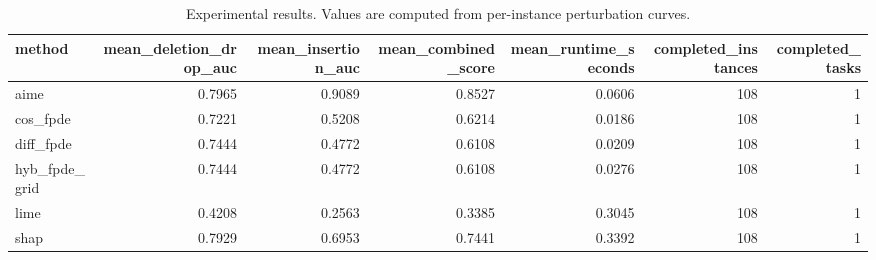 \begin{table}[t]
\caption{Experimental results. Values are computed from per-instance perturbation curves.}
\label{tab:main_results_computed}
\centering
\begin{tabular}{lrrrrrr}
\toprule
method & mean\_deletion\_drop\_auc & mean\_insertion\_auc & mean\_combined\_score & mean\_runtime\_seconds & completed\_instances & completed\_tasks \\
\midrule
aime & 0.7965 & 0.9089 & 0.8527 & 0.0606 & 108 & 1 \\
cos\_fpde & 0.7221 & 0.5208 & 0.6214 & 0.0186 & 108 & 1 \\
diff\_fpde & 0.7444 & 0.4772 & 0.6108 & 0.0209 & 108 & 1 \\
hyb\_fpde\_grid & 0.7444 & 0.4772 & 0.6108 & 0.0276 & 108 & 1 \\
lime & 0.4208 & 0.2563 & 0.3385 & 0.3045 & 108 & 1 \\
shap & 0.7929 & 0.6953 & 0.7441 & 0.3392 & 108 & 1 \\
\bottomrule
\end{tabular}

\end{table}
